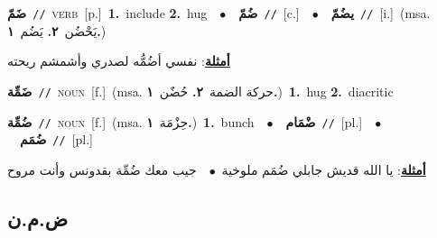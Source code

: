 \documentclass[10pt,a4paper,twoside]{article} %
\begin{document}
\begin{multicols}{2}
{\setlength\topsep{0pt}\textbf{\foreignlanguage{arabic}{ضَمّ}}\ {\color{gray}\texttt{//}\color{black}}\ \textsc{verb}\ [p.]\ \textbf{1.}~include  \textbf{2.}~hug\ \ $\bullet$\ \ \setlength\topsep{0pt}\textbf{\foreignlanguage{arabic}{ضُمّ}}\ {\color{gray}\texttt{//}\color{black}}\ [c.]\ \ $\bullet$\ \ \setlength\topsep{0pt}\textbf{\foreignlanguage{arabic}{يضُمّ}}\ {\color{gray}\texttt{//}\color{black}}\ [i.]\ \color{gray}(msa. \foreignlanguage{arabic}{يَحْضُن}~\foreignlanguage{arabic}{\textbf{٢.}}  \foreignlanguage{arabic}{يَضُم}~\foreignlanguage{arabic}{\textbf{١.}})\color{black}\  \begin{flushright}\color{gray}\foreignlanguage{arabic}{\textbf{\underline{\foreignlanguage{arabic}{أمثلة}}}: نفسي أضُمُّه لصدري وأشمشم ريحته}\end{flushright}\color{black}} \vspace{2mm}

{\setlength\topsep{0pt}\textbf{\foreignlanguage{arabic}{ضَمِّة}}\ {\color{gray}\texttt{//}\color{black}}\ \textsc{noun}\ [f.]\ \color{gray}(msa. \foreignlanguage{arabic}{حركة الضمة}~\foreignlanguage{arabic}{\textbf{٢.}}  \foreignlanguage{arabic}{حُضٌن}~\foreignlanguage{arabic}{\textbf{١.}})\color{black}\ \textbf{1.}~hug  \textbf{2.}~diacritic\ } \vspace{2mm}

{\setlength\topsep{0pt}\textbf{\foreignlanguage{arabic}{ضُمِّة}}\ {\color{gray}\texttt{//}\color{black}}\ \textsc{noun}\ [f.]\ \color{gray}(msa. \foreignlanguage{arabic}{حِزْمَة}~\foreignlanguage{arabic}{\textbf{١.}})\color{black}\ \textbf{1.}~bunch\ \ $\bullet$\ \ \setlength\topsep{0pt}\textbf{\foreignlanguage{arabic}{ضْمَام}}\ {\color{gray}\texttt{//}\color{black}}\ [pl.]\ \ $\bullet$\ \ \setlength\topsep{0pt}\textbf{\foreignlanguage{arabic}{ضُمَم}}\ {\color{gray}\texttt{//}\color{black}}\ [pl.]\  \begin{flushright}\color{gray}\foreignlanguage{arabic}{\textbf{\underline{\foreignlanguage{arabic}{أمثلة}}}: يا الله قديش جابلي ضُمَم ملوخية\ $\bullet$\ \  جيب معك ضُمِّة بقدونس وأنت مروح}\end{flushright}\color{black}} \vspace{2mm}

\vspace{-3mm}
\subsection*{\color{blue}\foreignlanguage{arabic}{ض.م.ن}\color{blue}{}} 


\end{multicols}
\end{document}
